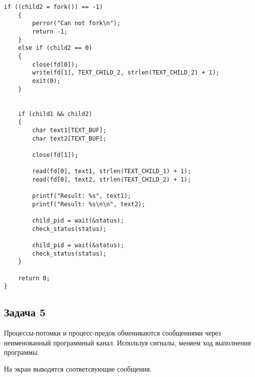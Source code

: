 \begin{lstlisting}[style={asm},label=lst:pipe,caption=Использование pipe()]
    if ((child2 = fork()) == -1)
    {
        perror("Can not fork\n");
        return -1;
    }
    else if (child2 == 0)
    {
        close(fd[0]);
        write(fd[1], TEXT_CHILD_2, strlen(TEXT_CHILD_2) + 1);
        exit(0);
    }


    if (child1 && child2)
    {
        char text1[TEXT_BUF];
        char text2[TEXT_BUF];

        close(fd[1]);

        read(fd[0], text1, strlen(TEXT_CHILD_1) + 1);
        read(fd[0], text2, strlen(TEXT_CHILD_2) + 1);

        printf("Result: %s", text1);
        printf("Result: %s\n\n", text2);

        child_pid = wait(&status);
        check_status(status);

        child_pid = wait(&status);
        check_status(status);
    }

    return 0;
}
\end{lstlisting} 



\clearpage

\subsection*{Задача 5} 
Процессы-потомки и процесс-предок обмениваются сообщениями через неименованный программный канал. Используя сигналы, меняем ход выполнения программы.

На экран выводятся соответсвующие сообщения.

